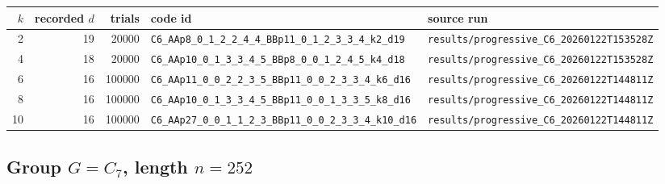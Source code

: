 \documentclass[11pt]{article}
\begin{document}
\begin{longtable}{@{}r r r l l@{}}
\toprule
$k$ & recorded $d$ & trials & code id & source run \\
\midrule
\endhead
2 & 19 & 20000 & \texttt{C6\_AAp8\_0\_1\_2\_2\_4\_4\_BBp11\_0\_1\_2\_3\_3\_4\_k2\_d19} & \texttt{results/progressive\_C6\_20260122T153528Z} \\
4 & 18 & 20000 & \texttt{C6\_AAp10\_0\_1\_3\_3\_4\_5\_BBp8\_0\_0\_1\_2\_4\_5\_k4\_d18} & \texttt{results/progressive\_C6\_20260122T153528Z} \\
6 & 16 & 100000 & \texttt{C6\_AAp11\_0\_0\_2\_2\_3\_5\_BBp11\_0\_0\_2\_3\_3\_4\_k6\_d16} & \texttt{results/progressive\_C6\_20260122T144811Z} \\
8 & 16 & 100000 & \texttt{C6\_AAp10\_0\_1\_3\_3\_4\_5\_BBp11\_0\_0\_1\_3\_3\_5\_k8\_d16} & \texttt{results/progressive\_C6\_20260122T144811Z} \\
10 & 16 & 100000 & \texttt{C6\_AAp27\_0\_0\_1\_1\_2\_3\_BBp11\_0\_0\_2\_3\_3\_4\_k10\_d16} & \texttt{results/progressive\_C6\_20260122T144811Z} \\
\bottomrule
\end{longtable}

\subsection{Group $G = C_{7}$, length $n=252$}
\end{document}
